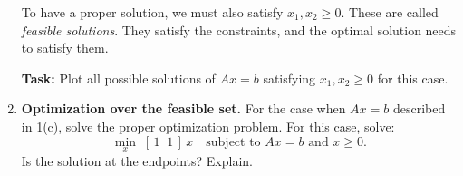 \documentclass[11pt]{article}
\begin{document}
\begin{enumerate}[label=\textbf{1(\alph*)}]
		\medskip
		To have a proper solution, we must also satisfy $x_1, x_2 \ge 0$. These are called
		\emph{feasible solutions}. They satisfy the constraints, and the optimal solution needs
		to satisfy them.
		
		\medskip
		\textbf{Task:} Plot all possible solutions of $Ax = b$ satisfying $x_1, x_2 \ge 0$ for this case.
		
		\item \textbf{Optimization over the feasible set.} For the case when $Ax = b$ described in 1(c), solve the proper optimization
		problem. For this case, solve:
		\begin{equation}
			\min_{x}\; [\,1\;\;1\,]\,x \quad \text{subject to } Ax = b \text{ and } x \ge 0.
			\label{eq:obj11}
		\end{equation}
		Is the solution at the endpoints? Explain.
	\end{enumerate}
	
\end{document}
